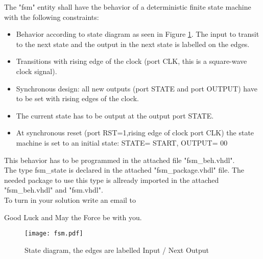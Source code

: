 \documentclass[a4paper,12pt]{article}
\begin{document}
The "fsm" entity shall have the behavior of a deterministic finite state machine with the following constraints:
\begin{itemize}
\item Behavior according to state diagram as seen in Figure \ref{state_image}. The input to transit to the next state and the output in the next state is labelled on the edges.
\item Transitions with rising edge of the clock (port CLK, this is a square-wave clock signal).
\item Synchronous design: all new outputs (port STATE and port OUTPUT) have to be set with rising edges of the clock.
\item The current state has to be output at the output port STATE.
\item At synchronous reset (port RST=1,rising edge of clock port CLK) the state machine is set to an initial state: STATE= START, OUTPUT= 00
\end{itemize}
\vspace{0.2cm}

This behavior has to be programmed in the attached file "fsm\_beh.vhdl".
\\

The type fsm\_state is declared in the attached "fsm\_package.vhdl" file. The needed package to use this type is allready imported in the attached "fsm\_beh.vhdl" and "fsm.vhdl". 
\\


To turn in your solution write an email to %

\vspace{0.7cm}

Good Luck and May the Force be with you.

\newpage

\begin{figure}[ht]
	\centering
  \texttt{[image: fsm.pdf]}
	\caption{State diagram, the edges are labelled Input / Next Output}
	\label{state_image}
\end{figure}
\end{document}
